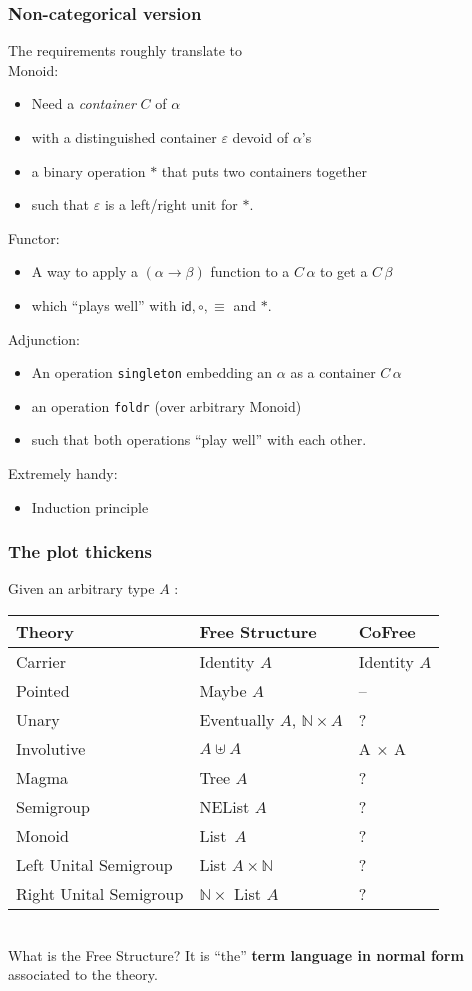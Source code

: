 \documentclass[serif,mathserif,professionalfont,10pt]{beamer}
\newcommand{\sred}[1]{\textcolor{slidered}{#1}}
\newcommand{\sblue}[1]{\textcolor{slideblue}{#1}}
\begin{document}
\begin{frame}
\frametitle{Non-categorical version}
The requirements roughly translate to\\
Monoid:
\begin{itemize}
\item Need a \emph{container} $C$ of $\alpha$
\item with a distinguished container $ε$ devoid of $\alpha$'s
\item a binary operation $*$ that puts two containers together
\item such that $ε$ is a left/right unit for $*$.
\end{itemize}
Functor:
\begin{itemize}
\item A way to apply a $(\alpha → \beta)$ function to a $C\, \alpha$ to get a $C \, \beta$
\item which ``plays well'' with $\mathsf{id}, ∘, ≡$ and $*$.
\end{itemize}
Adjunction:
\begin{itemize}
\item An operation \texttt{singleton} embedding an $\alpha$ as a container $C \, \alpha$
\item an operation \texttt{foldr} (over arbitrary Monoid)
\item such that both operations ``play well'' with each other.
\end{itemize}
Extremely handy:
\begin{itemize}
\item Induction principle
\end{itemize}
\end{frame}
%
%

\begin{frame}
\frametitle{The plot thickens}
Given an arbitrary type $A$ : \\ \vspace*{4mm}
\begin{tabular}{lll}
\textbf{Theory} & \textbf{Free Structure} & CoFree \\ \hline
Carrier & Identity $A$ & Identity $A$ \\
Pointed & Maybe $A$ & --\\ \hline
Unary & Eventually $A$, $ℕ × A$ &  ? \\
Involutive & $A ⊎ A$ & A × A \\ \hline
Magma & Tree $A$ &  ? \\
Semigroup & NEList $A$ & ? \\ \hline
Monoid & List\, $A$ & ? \\
Left Unital Semigroup & List $A × ℕ$ & ? \\
Right Unital Semigroup & $ℕ ×$ List $A$ & ? \\ \hline
\end{tabular}\\ \vspace*{4mm}
\pause
What is the \sblue{Free Structure}? It is ``the''
\sred{\textbf{term language in normal form}} associated to the theory.\\
\end{frame}
\end{document}

